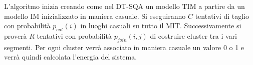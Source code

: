 L'algoritmo inizia creando come nel DT-SQA un modello TIM a partire da un modello IM inizializzato in maniera casuale. Si eseguiranno $C$ tentativi di taglio con probabilità $p_{cut}(i)$ in luoghi casuali su tutto il MIT. Successivamente si proverà $R$ tentativi con probabilità $p_{join}(i,j)$ di costruire cluster tra i vari segmenti. Per ogni cluster verrà associato in maniera casuale un valore 0 o 1 e verrà quindi calcolata l'energia del sistema.

